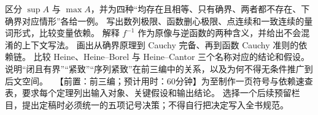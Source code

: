 \begin{enumerate}[label=\textbf{E.\arabic*.}]
  区分 \(\sup A\) 与 \(\max A\)，并为四种“均存在且相等、只有确界、两者都不存在、下确界对应情形”各给一例。
  写出数列极限、函数删心极限、点连续和一致连续的量词形式，比较变量依赖。
  解释 \(f^{-1}\) 作为原像与逆函数的两种含义，并给出不会混淆的上下文写法。
  画出从确界原理到 Cauchy 完备、再到函数 Cauchy 准则的依赖链。
  比较 Heine、Heine--Borel 与 Heine--Cantor 三个名称对应的结论和假设。
  说明“闭且有界”“紧致”“序列紧致”在前三编中的关系，以及为何不得无条件推广到后文空间。
  \ 【前置：前三编；预计用时：60分钟】为至制作一页符号与依赖速查表，要求每个定理列出输入对象、关键假设和输出结论。
  选择一个后续预留栏目，提出定稿时必须统一的五项记号决策；不得自行把决定写入全书规范。
\end{enumerate}
